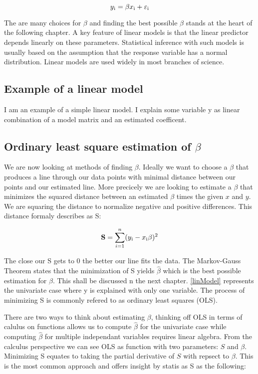 \documentclass{article}
\begin{document}
    \begin{equation}  \label{linModel} y\textsubscript{i} = \beta x\textsubscript{i} + \varepsilon\textsubscript{i} \end{equation}

    The are many choices for $\beta$ and finding the best possible $\beta$ stands at the heart of the following chapter. A key feature of linear models is that the linear predictor depends linearly on these parameters. Statistical inference with such models is usually based on the assumption that the response variable has a normal distribution. Linear models are used widely in most branches of science.

    \subsection{Example of a linear model}
    I am an example of a simple linear model. I explain some variable y as linear combination of a model matrix and an estimated coefficent.

    \subsection{Ordinary least square estimation of $\beta$}

    We are now looking at methods of finding $\beta$. Ideally we want to choose a $\beta$ that produces a line through our data points with minimal distance between our points and our estimated line. More precicely we are looking to estimate a $\beta$ that minimizes the squared distance between an estimated $\beta$ times the given $x$ and $y$. We are squaring the distance to normalize negative and positive differences. This distance formaly describes as S:

    \begin{equation} \label{sumSquares} \mathbf{S} =  \sum_{i=1}^{n}(y\textsubscript{i} - x\textsubscript{i}\beta)^{2} \end{equation}

    The close our S gets to 0 the better our line fits the data. The  Markov-Gauss Theorem states that the minimization of S yields $\widehat{\beta}$ which is the best possible estimation for $\beta$. This shall be discussed n the next chapter. \ref{linModel} represents the univariate case where y is explained with only one variable. The process of minimizing S is commonly refered to as ordinary least squares (OLS).

    There are two ways to think about estimating $\beta$, thinking off OLS in terms of calulus on functions allows us to compute $\widehat{\beta}$ for the univariate case while computing $\widehat{\beta}$ for multiple independant variables requires linear algebra. From the calculus perspective we can see OLS as function with two parameters: $S$ and $\beta$. Minimizing S equates to taking the partial derivative of $S$ with repsect to $\beta$. This is the most common approach and offers insight by statis as S as the following:
\end{document}

